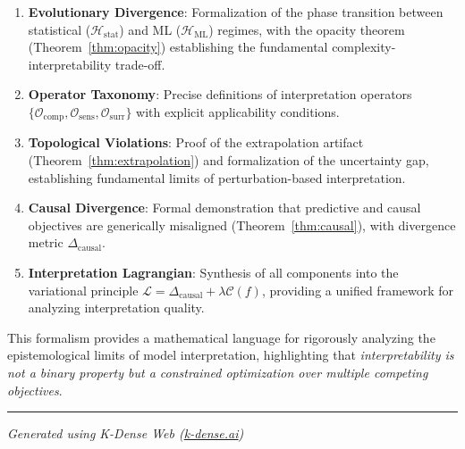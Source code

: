 \documentclass[11pt,a4paper]{article}
\theoremstyle{definition}
\newcommand{\Hstat}{\mathcal{H}_{\text{stat}}}
\newcommand{\Hml}{\mathcal{H}_{\text{ML}}}
\newcommand{\Ocomp}{\mathcal{O}_{\text{comp}}}
\newcommand{\Osens}{\mathcal{O}_{\text{sens}}}
\newcommand{\Osurr}{\mathcal{O}_{\text{surr}}}
\newcommand{\Dcausal}{\Delta_{\text{causal}}}
\newcommand{\Complex}{\mathcal{C}}
\begin{document}
\begin{enumerate}
    \item \textbf{Evolutionary Divergence}: Formalization of the phase transition between statistical ($\Hstat$) and ML ($\Hml$) regimes, with the opacity theorem (Theorem~\ref{thm:opacity}) establishing the fundamental complexity-interpretability trade-off.

    \item \textbf{Operator Taxonomy}: Precise definitions of interpretation operators $\{\Ocomp, \Osens, \Osurr\}$ with explicit applicability conditions.

    \item \textbf{Topological Violations}: Proof of the extrapolation artifact (Theorem~\ref{thm:extrapolation}) and formalization of the uncertainty gap, establishing fundamental limits of perturbation-based interpretation.

    \item \textbf{Causal Divergence}: Formal demonstration that predictive and causal objectives are generically misaligned (Theorem~\ref{thm:causal}), with divergence metric $\Dcausal$.

    \item \textbf{Interpretation Lagrangian}: Synthesis of all components into the variational principle $\mathcal{L} = \Dcausal + \lambda \Complex(f)$, providing a unified framework for analyzing interpretation quality.
\end{enumerate}

This formalism provides a mathematical language for rigorously analyzing the epistemological limits of model interpretation, highlighting that \textit{interpretability is not a binary property but a constrained optimization over multiple competing objectives}.

\vspace{2em}
\hrule
\vspace{0.5em}
\begin{center}
\textit{Generated using K-Dense Web (\href{https://k-dense.ai}{k-dense.ai})}
\end{center}
\end{document}
